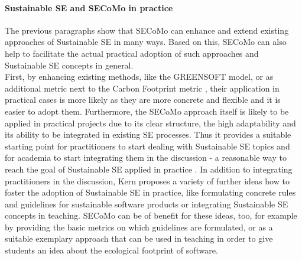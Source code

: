 \documentclass[oribibl]{llncs}
\begin{document}
\paragraph{Sustainable SE and SECoMo in practice}
The previous paragraphs show that SECoMo can enhance and extend existing approaches of Sustainable SE in many ways. Based on this, SECoMo can also help to facilitate the actual practical adoption of such approaches and Sustainable SE concepts in general.\\
First, by enhancing existing methods, like the GREENSOFT model, or as additional metric next to the Carbon Footprint metric \cite{kern_impacts_2015}, their application in practical cases is more likely as they are more concrete and flexible and it is easier to adopt them.
Furthermore, the SECoMo approach itself is likely to be applied in practical projects due to its clear structure, the high adaptability and its ability to be integrated in existing SE processes. %
Thus it provides a suitable starting point for practitioners to start dealing with Sustainable SE topics and for academia to start integrating them in the discussion - a reasonable way to reach the goal of Sustainable SE applied in practice \cite{kern_how_2016}.
In addition to integrating practitioners in the discussion, Kern \cite{kern_how_2016} proposes a variety of further ideas how to foster the adoption of Sustainable SE in practice, like formulating concrete rules and guidelines for sustainable software products or integrating Sustainable SE concepts in teaching. SECoMo can be of benefit for these ideas, too, for example by providing the basic metrics on which guidelines are formulated, or as a suitable exemplary approach that can be used in teaching in order to give students an idea about the ecological footprint of software. %
\end{document}
